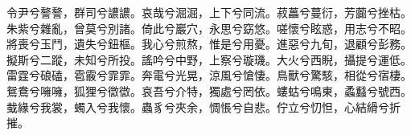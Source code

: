 
\begin{pinyinscope}
令尹兮謷謷，群司兮譨譨。哀哉兮淈淈，上下兮同流。菽藟兮蔓衍，芳虈兮挫枯。朱紫兮雜亂，曾莫兮別諸。倚此兮巖穴，永思兮窈悠。嗟懷兮眩惑，用志兮不昭。將喪兮玉鬥，遺失兮鈕樞。我心兮煎熬，惟是兮用憂。進惡兮九旬，退顧兮彭務。擬斯兮二蹤，未知兮所投。謠吟兮中野，上察兮璇璣。大火兮西睨，攝提兮運低。雷霆兮硠磕，雹霰兮霏霏。奔電兮光晃，涼風兮愴悽。鳥獸兮驚駭，相從兮宿棲。鴛鴦兮噰噰，狐狸兮徾徾。哀吾兮介特，獨處兮罔依。螻蛄兮鳴東，蟊蠽兮號西。蛓緣兮我裳，蠋入兮我懷。蟲豸兮夾余，惆悵兮自悲。佇立兮忉怛，心結縎兮折摧。


\end{pinyinscope}